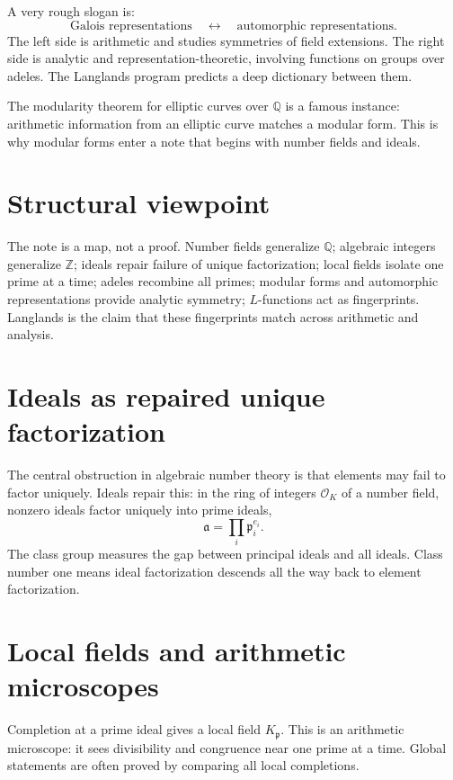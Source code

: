 A very rough slogan is:
\[
  \text{Galois representations}\quad\leftrightarrow\quad\text{automorphic representations}.
\]
The left side is arithmetic and studies symmetries of field extensions.  The right side is analytic and representation-theoretic, involving functions on groups over adeles.  The Langlands program predicts a deep dictionary between them.

The modularity theorem for elliptic curves over \(\mathbb Q\) is a famous instance: arithmetic information from an elliptic curve matches a modular form.  This is why modular forms enter a note that begins with number fields and ideals.

\section{Structural viewpoint}

The note is a map, not a proof.  Number fields generalize \(\mathbb Q\); algebraic integers generalize \(\mathbb Z\); ideals repair failure of unique factorization; local fields isolate one prime at a time; adeles recombine all primes; modular forms and automorphic representations provide analytic symmetry; \(L\)-functions act as fingerprints.  Langlands is the claim that these fingerprints match across arithmetic and analysis.

\section{Ideals as repaired unique factorization}

The central obstruction in algebraic number theory is that elements may fail to factor uniquely.  Ideals repair this: in the ring of integers \(\mathcal O_K\) of a number field, nonzero ideals factor uniquely into prime ideals,
\[
  \mathfrak a=\prod_i \mathfrak p_i^{e_i}.
\]
The class group measures the gap between principal ideals and all ideals.  Class number one means ideal factorization descends all the way back to element factorization.

\section{Local fields and arithmetic microscopes}

Completion at a prime ideal gives a local field \(K_{\mathfrak p}\).  This is an arithmetic microscope: it sees divisibility and congruence near one prime at a time.  Global statements are often proved by comparing all local completions.

